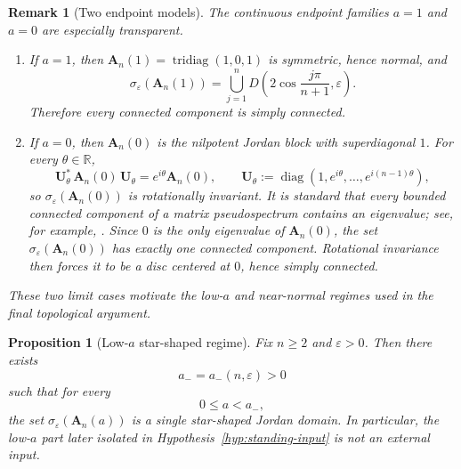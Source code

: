 \documentclass[11pt]{article}
\newtheorem{proposition}[theorem]{Proposition}
\newtheorem{remark}[theorem]{Remark}
\DeclareMathOperator{\diag}{diag}
\DeclareMathOperator{\tridiag}{tridiag}
\newcommand{\R}{\mathbb{R}}
\begin{document}
\begin{remark}[Two endpoint models]\label{rem:endpoints}
The continuous endpoint families \(a=1\) and \(a=0\) are especially transparent.

\begin{enumerate}
\item If \(a=1\), then \(\mathbf A_n(1)=\tridiag(1,0,1)\) is symmetric, hence normal, and
\[
\sigma_\varepsilon(\mathbf A_n(1))
=
\bigcup_{j=1}^n
D\!\left(2\cos\frac{j\pi}{n+1},\varepsilon\right).
\]
Therefore every connected component is simply connected.

\item If \(a=0\), then \(\mathbf A_n(0)\) is the nilpotent Jordan block with superdiagonal \(1\). For every \(\theta\in\R\),
\[
\mathbf U_\theta^*\,\mathbf A_n(0)\,\mathbf U_\theta
=
e^{i\theta}\mathbf A_n(0),
\qquad
\mathbf U_\theta:=\diag(1,e^{i\theta},\dots,e^{i(n-1)\theta}),
\]
so \(\sigma_\varepsilon(\mathbf A_n(0))\) is rotationally invariant. It is standard that every bounded connected component of a matrix pseudospectrum contains an eigenvalue; see, for example, \cite{TrefethenEmbree2005}. Since \(0\) is the only eigenvalue of \(\mathbf A_n(0)\), the set \(\sigma_\varepsilon(\mathbf A_n(0))\) has exactly one connected component. Rotational invariance then forces it to be a disc centered at \(0\), hence simply connected.
\end{enumerate}

These two limit cases motivate the low-\(a\) and near-normal regimes used in the final topological argument.
\end{remark}

\begin{proposition}[Low-\(a\) star-shaped regime]\label{prop:low-a}
Fix \(n\ge 2\) and \(\varepsilon>0\). Then there exists
\[
a_-=a_-(n,\varepsilon)>0
\]
such that for every
\[
0\le a<a_-,
\]
the set \(\sigma_\varepsilon(\mathbf A_n(a))\) is a single star-shaped Jordan domain.
In particular, the low-\(a\) part later isolated in
Hypothesis~\ref{hyp:standing-input} is not an external input.
\end{proposition}
\end{document}

